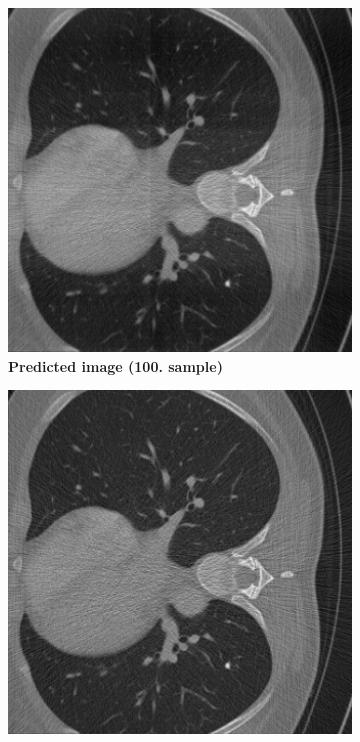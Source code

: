 \documentclass[12pt,a4paper]{article}
\begin{document}
\begin{figure}[h!]
\begin{subfigure}[t]{\size\textwidth}
        \centering
        \includegraphics[width=\textwidth]{Bachelorthesis/UsedImages/Train1000_L2_100epochs/Training_L2_1000_100epochs_after10/pred_100_train1000l2100.png}
        \caption{\textbf{Predicted image (100. sample)}}
        \label{fig:windowII+l2+slow+subset_learned100}
    \end{subfigure}
    \hfill
    \begin{subfigure}[t]{\size\textwidth}
        \centering
       \includegraphics[width=\textwidth]{Bachelorthesis/UsedImages/Train1000_L2_100epochs/Training_L2_1000_100epochs_after10/vanilla_100_train1000l2100.png}

\end{subfigure}
\end{figure}
\end{document}
